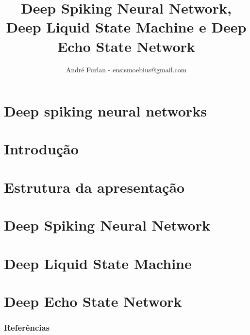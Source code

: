 

\title{Deep Spiking Neural Network, Deep Liquid	State Machine e Deep Echo State Network}


\author{André Furlan - ensismoebius@gmail.com}

\date{\the\year}


	
	\frame{\titlepage}
	
	\section{Deep spiking neural networks}
		
	
	\section{Introdução}
		

	\section{Estrutura da apresentação}
		

	\section{Deep Spiking Neural Network}
		
	\section{Deep Liquid State Machine}
		
	\section{Deep Echo State Network}
		
	
	\begin{frame}[allowframebreaks]
		\frametitle{Referências}
		
	\end{frame}
	
